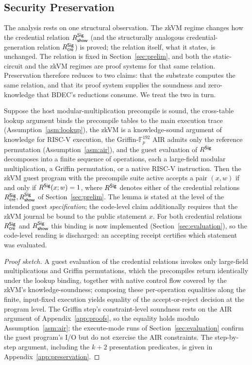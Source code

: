 \subsection{Security Preservation}\label{ssec:preservation}
The analysis rests on one structural observation. The zkVM regime changes how the credential relation $R_{\mathsf{show}}^{\mathsf{Sig}}$ (and the structurally analogous credential-generation relation $R_{\mathsf{cre}}^{\mathsf{Sig}}$) is proved; the relation itself, what it states, is unchanged. The relation is fixed in Section~\ref{sec:prelim}, and both the static-circuit and the zkVM regimes are proof systems for that same relation. Preservation therefore reduces to two claims: that the substrate computes the same relation, and that its proof system supplies the soundness and zero-knowledge that BDEC's reductions consume. We treat the two in turn.

\begin{lemma}\label{lem:relation-preserve}
    Suppose the host modular-multiplication precompile is sound, the cross-table lookup argument binds the precompile tables to the main execution trace (Assumption~\ref{asm:lookup}), the zkVM is a knowledge-sound argument of knowledge for RISC-V execution, the Griffin-$\mathbb{F}_p^{192}$ AIR admits only the reference permutation (Assumption~\ref{asm:air}), and the guest evaluation of $R^{\mathsf{Sig}}$ decomposes into a finite sequence of operations, each a large-field modular multiplication, a Griffin permutation, or a native RISC-V instruction. Then the zkVM guest program with the precompile suite active accepts a pair $(x,w)$ if and only if $R^{\mathsf{Sig}}(x;w)=1$, where $R^{\mathsf{Sig}}$ denotes either of the credential relations $R^{\mathsf{Sig}}_{\mathsf{cre}},R^{\mathsf{Sig}}_{\mathsf{show}}$ of Section~\ref{sec:prelim}. The lemma is stated at the level of the intended guest \emph{specification}; the code-level claim additionally requires that the zkVM journal be bound to the public statement $x$. For both credential relations $R^{\mathsf{Sig}}_{\mathsf{cre}}$ and $R^{\mathsf{Sig}}_{\mathsf{show}}$ this binding is now implemented (Section~\ref{sec:evaluation}), so the code-level reading is discharged: an accepting receipt certifies which statement was evaluated.
\end{lemma}

\begin{proof}[Proof sketch]
    A guest evaluation of the credential relations invokes only large-field multiplications and Griffin permutations, which the precompiles return identically under the lookup binding, together with native control flow covered by the zkVM's knowledge-soundness; composing these per-operation equalities along the finite, input-fixed execution yields equality of the accept-or-reject decision at the program level. The Griffin step's constraint-level soundness rests on the AIR argument of Appendix~\ref{app:proofs}, so the equality holds modulo Assumption~\ref{asm:air}; the execute-mode runs of Section~\ref{sec:evaluation} confirm the guest program's I/O but do not exercise the AIR constraints. The step-by-step argument, including the $k+2$ presentation predicates, is given in Appendix~\ref{app:preservation}.
\end{proof}

